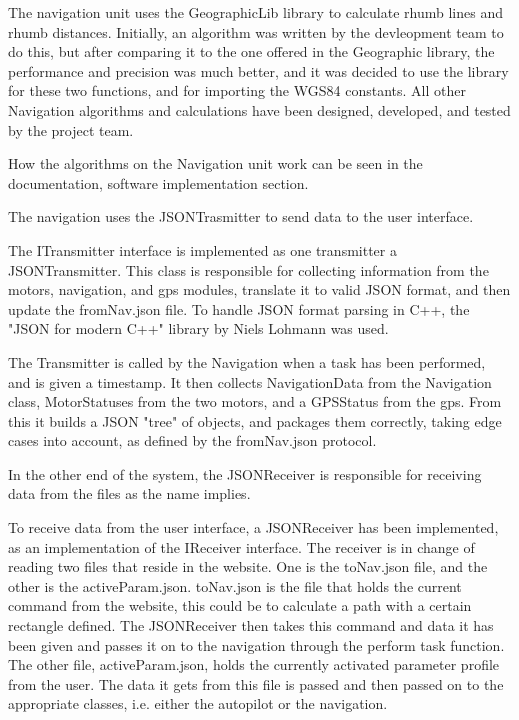 The navigation unit uses the GeographicLib library to calculate rhumb lines and rhumb distances. Initially, an algorithm was written by the devleopment team to do this, but after comparing it to the one offered in the Geographic library, the performance and precision was much better, and it was decided to use the library for these two functions, and for importing the WGS84 constants. All other Navigation algorithms and calculations have been designed, developed, and tested by the project team.

How the algorithms on the Navigation unit work can be seen in the documentation, software implementation section.

The navigation uses the JSONTrasmitter to send data to the user interface.

The ITransmitter interface is implemented as one transmitter a JSONTransmitter. This class is responsible for collecting information from the motors, navigation, and gps modules, translate it to valid JSON format, and then update the fromNav.json file. To handle JSON format parsing in C++, the "JSON for modern C++" library by Niels Lohmann was used\cite{json}. 

The Transmitter is called by the Navigation when a task has been performed, and is given a timestamp. It then collects NavigationData from the Navigation class, MotorStatuses from the two motors, and a GPSStatus from the gps. From this it builds a JSON "tree" of objects, and packages them correctly, taking edge cases into account, as defined by the fromNav.json protocol. 

In the other end of the system, the JSONReceiver is responsible for receiving data from the files as the name implies.

To receive data from the user interface, a JSONReceiver has been implemented, as an implementation of the IReceiver interface. The receiver is in change of reading two files that reside in the website. One is the toNav.json file, and the other is the activeParam.json. toNav.json is the file that holds the current command from the website, this could be to calculate a path with a certain rectangle defined. The JSONReceiver then takes this command and data it has been given and passes it on to the navigation through the perform task function. The other file, activeParam.json, holds the currently activated parameter profile from the user. The data it gets from this file is passed and then passed on to the appropriate classes, i.e. either the autopilot or the navigation.

